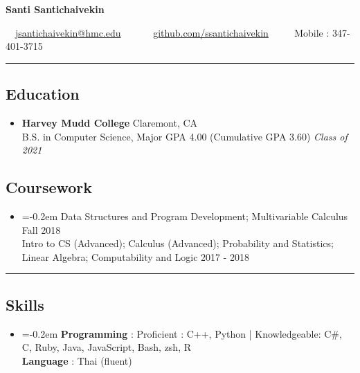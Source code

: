 \documentclass[10.5pt,letterpaper]{article}
\begin{document}
\begin{center}
{\Large \textbf{Santi Santichaivekin}}

\ \ \href{mailto:jsantichaivekin@hmc.edu}{jsantichaivekin@hmc.edu}\ \ 
\ \ \textbullet
\ \ \href{https://github.com/ssantichaivekin}{github.com/ssantichaivekin}
\ \ \textbullet
\ \ Mobile : 347-401-3715

\end{center}


\hrule
\vspace{-1.0em}
\subsection*{Education}
  \begin{itemize}
    \parskip=-0.5em

    \item[]
    \textbf{Harvey Mudd College} \hfill
      Claremont, CA\\
    {B.S. in Computer Science, Major GPA 4.00 (Cumulative GPA 3.60) \hfill \emph{Class of 2021}}
  \end{itemize}
  \vspace{-2.2em}
\subsection*{Coursework}
\begin{itemize}
\item[]
    \parskip=-0.2em
  Data Structures and Program Development; Multivariable Calculus  \hfill Fall 2018\\
  Intro to CS (Advanced); Calculus (Advanced); Probability and Statistics; Linear Algebra; Computability and Logic \hfill 2017 - 2018

\end{itemize}

\hrule
\vspace{-1.0em}
\subsection*{Skills}
\begin{itemize}
\item[]
    \parskip=-0.2em
  \textbf{Programming} : Proficient : C++, Python | Knowledgeable: C\#, C, Ruby, Java, JavaScript, Bash, zsh, R\\
  \textbf{Language} : Thai (fluent)
    
\end{itemize}
\end{document}
